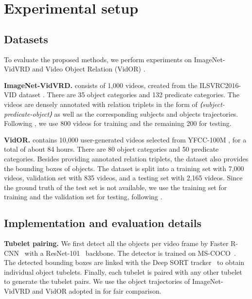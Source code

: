 \documentclass[10pt,twocolumn,letterpaper]{article}
\begin{document}
\section{Experimental setup}

\subsection{Datasets}
To evaluate the proposed methods, we perform experiments on ImageNet-VidVRD \cite{shang2017video} and Video Object Relation (VidOR) \cite{shang2019annotating}.

\textbf{ImageNet-VidVRD.} \cite{shang2017video} consists of 1,000 videos, created from the ILSVRC2016-VID dataset \cite{russakovsky2015imagenet}. There are 35 object categories and 132 predicate categories. The videos are densely annotated with relation triplets in the form of \emph{⟨subject-predicate-object⟩} as well as the corresponding subjects and objects trajectories. Following \cite{shang2017video, tsai2019video}, we use 800 videos for training and the remaining 200 for testing. 

\textbf{VidOR.} \cite{shang2019annotating} contains 10,000 user-generated videos selected from YFCC-100M \cite{thomee2016yfcc100m}, for a total of about 84 hours. There are 80 object categories and 50 predicate categories. Besides providing annotated relation triplets, the dataset also provides the bounding boxes of objects. The dataset is split into a training set with 7,000 videos, validation set with 835 videos, and a testing set with 2,165 videos. Since the ground truth of the test set is not available, we use the training set for training and the validation set for testing, following \cite{liu2020beyond,qian2019video, xie2020video, su2020video}.

\subsection{Implementation and evaluation details}
\label{sec:implementation}



\textbf{Tubelet pairing.} We first detect all the objects per video frame by Faster R-CNN~\cite{2015NIPS-faster} with a ResNet-101~\cite{2016CVPR-ResNet} backbone. The detector is trained on MS-COCO~\cite{lin2014microsoft}. The detected bounding boxes are linked with the Deep SORT tracker~\cite{2017ICIP-DeepSort} to obtain individual object tubelets. 
Finally, each tubelet is paired with any other tubelet to generate the tubelet pairs. We use the object trajectories of ImageNet-VidVRD and VidOR adopted in \cite{shang2017video, qian2019video, su2020video, sun2019video} for fair comparison. 
\end{document}
